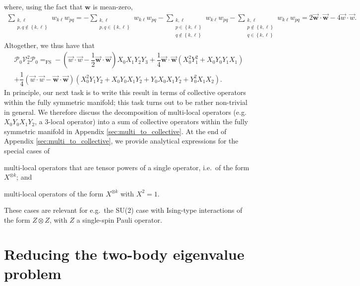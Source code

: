 \documentclass[nofootinbib,notitlepage,11pt]{revtex4-2}
\newcommand{\f}[2]{\dfrac{#1}{#2}} %
\newcommand{\p}[1]{\left(#1\right)} %
\renewcommand{\set}[1]{\left\{#1\right\}} %
\renewcommand{\c}{\cdot} %
\newcommand{\m}{\bm} %
\renewcommand{\v}{\vec} %
\newcommand{\1}{\mathds{1}}
\renewcommand{\P}{\mathcal{P}}
\newcommand{\V}{\mathcal{V}}
\newcommand{\EQFS}{=_{\text{FS}}}
\begin{document}
where, using the fact that $\m w$ is mean-zero,
\begin{align}
  \sum_{\substack{k,\ell\\p,q\notin\set{k,\ell}}} w_{k\ell} w_{pq}
  = - \sum_{\substack{k,\ell\\p,q\in\set{k,\ell}}} w_{k\ell} w_{pq}
  - \sum_{\substack{k,\ell\\p\in\set{k,\ell}\\q\notin\set{k,\ell}}}
  w_{k\ell} w_{pq}
  - \sum_{\substack{k,\ell\\p\notin\set{k,\ell}\\q\in\set{k,\ell}}}
  w_{k\ell} w_{pq}
  = 2 \v{\m w}\c\v{\m w} - 4 \v w\c\v w.
\end{align}
Altogether, we thus have that
\begin{multline}
  \P_0 \V_2^2 \P_0
  \EQFS -\p{\v w\c\v w - \f12 \v{\m w}\c\v{\m w}} X_0 X_1 Y_2 Y_3
  + \f14 \v{\m w}\c\v{\m w} \p{X_0^2 Y_1^2 + X_0 Y_0 Y_1 X_1} \\
  + \f14 \p{\v w\c\v w - \v{\m w}\c\v{\m w}}
  \p{X_0^2 Y_1 Y_2 + X_0 Y_0 X_1 Y_2
    + Y_0 X_0 X_1 Y_2 + Y_0^2 X_1 X_2}.
  \label{eq:PXYXYP}
\end{multline}
In principle, our next task is to write this result in terms of
collective operators within the fully symmetric manifold; this task
turns out to be rather non-trivial in general.  We therefore discuss
the decomposition of multi-local operators (e.g.~$X_0Y_0X_1Y_2$, a
3-local operator) into a sum of collective operators within the fully
symmetric manifold in Appendix \ref{sec:multi_to_collective}.  At the
end of Appendix \ref{sec:multi_to_collective}, we provide analytical
expressions for the special cases of
\begin{enumerate*}
\item multi-local operators that are tensor powers of a single
  operator, i.e.~of the form $X^{\otimes k}$; and
\item multi-local operators of the form $X^{\otimes k}$ with $X^2=1$.
\end{enumerate*}
These cases are relevant for e.g.~the SU(2) case with Ising-type
interactions of the form $Z\otimes Z$, with $Z$ a single-spin Pauli
operator.

\section{Reducing the two-body eigenvalue problem}
\label{sec:reduction}
\end{document}
